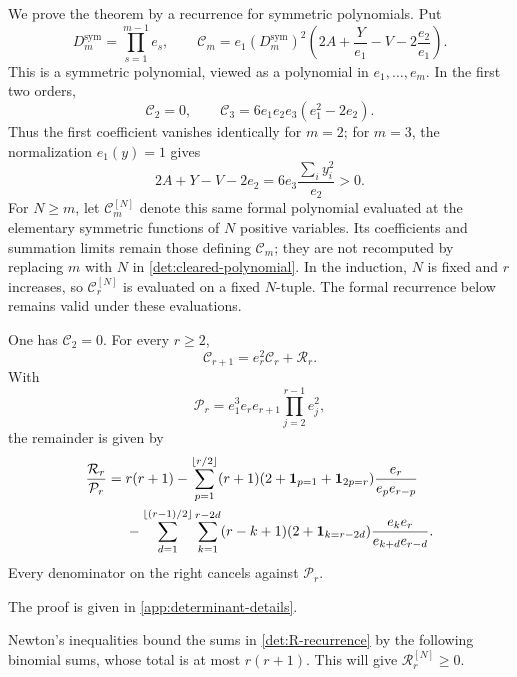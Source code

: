 We prove the theorem by a recurrence for symmetric polynomials.  Put
\begin{equation}\label{det:cleared-polynomial}
 D_m^{\mathrm{sym}}=\prod_{s=1}^{m-1}e_s,\qquad
 \mathcal C_m=e_1(D_m^{\mathrm{sym}})^2
       \left(2A+\frac{Y}{e_1}-V-2\frac{e_2}{e_1}\right).
\end{equation}
This is a symmetric polynomial, viewed as a polynomial in
$e_1,\ldots,e_m$. In the first two orders,
\[
 \mathcal C_2=0,\qquad
 \mathcal C_3=6e_1e_2e_3(e_1^2-2e_2).
\]
Thus the first coefficient vanishes identically for $m=2$; for
$m=3$, the normalization $e_1(y)=1$ gives
\[
 2A+Y-V-2e_2
 =6e_3\frac{\sum_i y_i^2}{e_2}>0.
\]
For $N\geq m$, let $\mathcal C_m^{[N]}$ denote
this same formal polynomial evaluated at the elementary symmetric
functions of $N$ positive variables. Its coefficients and summation
limits remain those defining \(\mathcal C_m\); they are not recomputed
by replacing \(m\) with \(N\) in \eqref{det:cleared-polynomial}.
In the induction, \(N\) is fixed and \(r\) increases, so
\(\mathcal C_r^{[N]}\) is evaluated on a fixed \(N\)-tuple.
The formal recurrence below remains valid under these evaluations.

\begin{lemma}\label{det:stable-recurrence}
One has $\mathcal C_2=0$.  For every $r\geq2$,
\begin{equation}\label{det:C-recurrence}
 \mathcal C_{r+1}=e_r^2\mathcal C_r+\mathcal R_r.
\end{equation}
With
\[
 \mathcal P_r=e_1^3e_re_{r+1}\prod_{j=2}^{r-1}e_j^2,
\]
the remainder is given by
\begin{align}
 \frac{\mathcal R_r}{\mathcal P_r}
 ={}&r(r+1)
 -\sum_{p=1}^{\lfloor r/2\rfloor}
       (r+1)(2+\mathbf1_{p=1}+\mathbf1_{2p=r})
       \frac{e_r}{e_pe_{r-p}}\notag\\
 &-\sum_{d=1}^{\lfloor(r-1)/2\rfloor}
       \sum_{k=1}^{r-2d}
       (r-k+1)(2+\mathbf1_{k=r-2d})
       \frac{e_ke_r}{e_{k+d}e_{r-d}}.
 \label{det:R-recurrence}
\end{align}
Every denominator on the right cancels against $\mathcal P_r$.
\end{lemma}

The proof is given in \cref{app:determinant-details}.

Newton's inequalities bound the sums in \eqref{det:R-recurrence}
by the following binomial sums, whose total is at most \(r(r+1)\).
This will give \(\mathcal R_r^{[N]}\geq0\).

